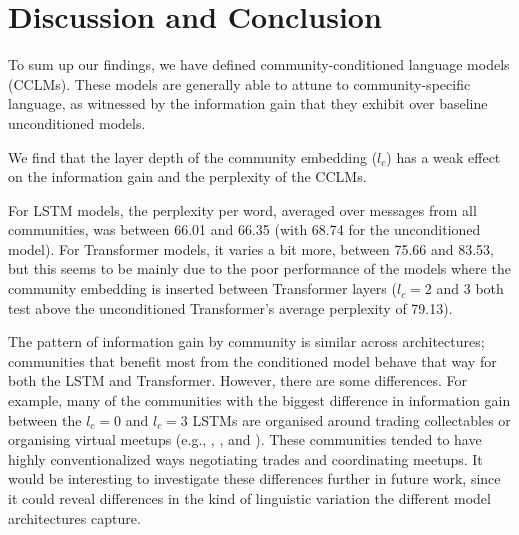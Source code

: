 \documentclass[11pt]{article}
\begin{document}
\section{Discussion and Conclusion}\label{sec:discussion-conclusion}

To sum up our findings, we have defined community-conditioned language
models (CCLMs). These models are generally able to attune to
community-specific language, as witnessed by the information gain that
they exhibit over baseline unconditioned models.

We find that the layer depth of the community embedding 
($l_c$) has a weak effect on the information gain and the
perplexity of the CCLMs.

For LSTM models, the perplexity per word, averaged over
messages from all communities, was between \num{66.01} and \num{66.35}
(with \num{68.74} for the unconditioned model).
For Transformer models, it varies a bit more, between \num{75.66} and \num{83.53},
but this seems to be mainly due to the poor performance of the models where
the community embedding is inserted between Transformer layers
($l_c=2$ and $3$ both test above the unconditioned Transformer's 
average perplexity of \num{79.13}).

The pattern of information gain by community is similar across
architectures;  communities that benefit most from the conditioned
model behave that way for both the LSTM and Transformer.  However,
there are some differences.  For example, many of the communities with the biggest 
difference in information gain between the $l_c=0$ and $l_c=3$ LSTMs 
are organised around trading collectables or organising virtual meetups
(e.g.,
,
, and
).  
These communities tended to have highly conventionalized ways negotiating trades
and coordinating meetups.
It would be interesting to investigate these differences further in future work, since it
could reveal differences in the kind of linguistic variation the
different model architectures capture.


\end{document}
